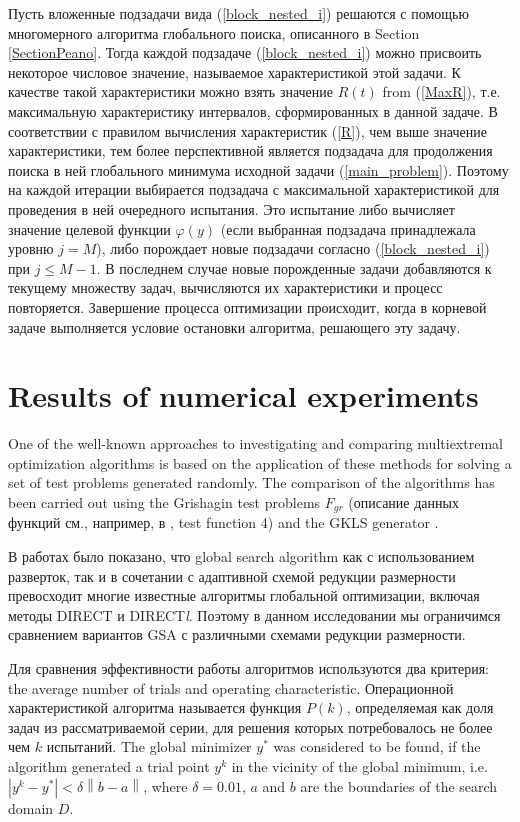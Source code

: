 \documentclass[runningheads]{llncs}
\begin{document}
Пусть вложенные подзадачи вида (\ref{block_nested_i}) решаются с помощью многомерного алгоритма глобального поиска, описанного в Section \ref{SectionPeano}. Тогда каждой подзадаче (\ref{block_nested_i}) можно присвоить некоторое числовое
значение, называемое характеристикой этой задачи. К качестве такой характеристики можно взять значение $R(t)$ from (\ref{MaxR}), т.е. максимальную характеристику интервалов, сформированных в данной задаче. В соответствии с правилом вычисления характеристик (\ref{R}), чем выше значение характеристики, тем более перспективной является подзадача для продолжения поиска в ней глобального минимума исходной задачи (\ref{main_problem}). Поэтому на каждой итерации выбирается подзадача с максимальной характеристикой для проведения в ней очередного испытания. Это испытание либо вычисляет значение целевой функции $\varphi(y)$ (если выбранная подзадача принадлежала уровню $j=M$), либо порождает новые подзадачи согласно (\ref{block_nested_i}) при $j\leq M-1$. В последнем случае новые порожденные задачи добавляются к текущему множеству задач, вычисляются их характеристики и процесс повторяется. Завершение процесса оптимизации происходит, когда в корневой задаче выполняется условие остановки алгоритма, решающего эту задачу.

\section{Results of numerical experiments}

One of the well-known approaches to investigating and comparing multiextremal 
optimization algorithms is based on the application of these methods for 
solving a set of test problems generated randomly.
\Russian
The comparison of the algorithms has been carried out using the Grishagin test problems $F_{gr}$ (описание данных функций см., например, в \cite{Grishagin1994}, test function 4) and the GKLS generator \cite{Gaviano2003}.

В работах \cite{Barkalov2015,Grishagin2018} было показано, что global search algorithm как с использованием разверток, так и в сочетании с адаптивной схемой редукции размерности превосходит многие известные алгоритмы глобальной оптимизации, включая методы DIRECT и DIRECT\textit{l}. Поэтому в данном исследовании мы ограничимся сравнением вариантов GSA с различными схемами редукции размерности.

Для сравнения эффективности работы алгоритмов используются два критерия: the average number of trials and operating characteristic.
Операционной характеристикой алгоритма называется функция $P(k)$, определяемая как доля задач из рассматриваемой серии, для решения которых потребовалось не более чем $k$ испытаний.
The global minimizer $y^\ast$ was considered to be found, if the algorithm generated a trial point $y^k$ in the vicinity of the global minimum, i.e. $\left|y^k-y^\ast\right| < \delta \left\|b-a\right\|$, where $\delta = 0.01$, $a$ and $b$ are the boundaries of the search domain $D$.
\end{document}
